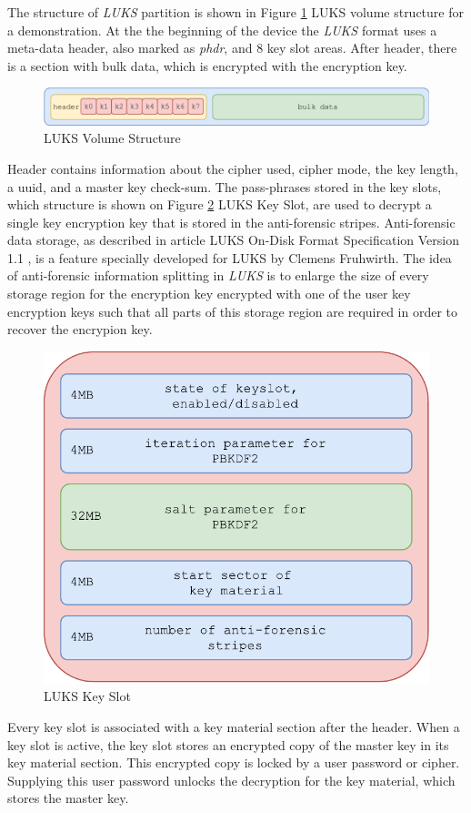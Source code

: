 The structure of {\it LUKS} partition is shown in Figure \ref{fig_luksvol} LUKS volume structure for a demonstration.
At the the beginning of the device the {\it LUKS} format uses a meta-data header, also marked as {\it phdr}, and 8 key slot areas.
After header, there is a section with bulk data, which is encrypted with the encryption key.
\begin{figure}[h]
    \centering
    \includegraphics[scale=0.7]{figures/LUKSdrive.pdf}
    \caption{LUKS Volume Structure}
    \label{fig_luksvol}
\end{figure}
Header contains information about the cipher used, cipher mode, the key length, a uuid, and a master key check-sum.
The pass-phrases stored in the key slots, which structure is shown on Figure \ref{fig_luksslot} LUKS Key Slot, are used to decrypt a single key encryption key that is stored in the anti-forensic stripes.
Anti-forensic data storage, as described in article LUKS On-Disk Format Specification Version 1.1 \cite{fruhwirth2005luks}, is a feature specially developed for LUKS by Clemens Fruhwirth.
The idea of anti-forensic information splitting in {\it LUKS} is to enlarge the size of every storage region for the encryption key encrypted with one of the user key encryption keys such that all parts of this storage region are required in order to recover the encrypion key.

\begin{figure}[h]
    \centering
    \includegraphics[scale=0.6]{figures/LUKSkeyslot.pdf}
    \caption{LUKS Key Slot}
    \label{fig_luksslot}
\end{figure}
Every key slot is associated with a key material section after the header.
When a key slot is active, the key slot stores an encrypted copy of the master key in its key material section.
This encrypted copy is locked by a user password or cipher.
Supplying this user password unlocks the decryption for the key material, which stores the master key.



